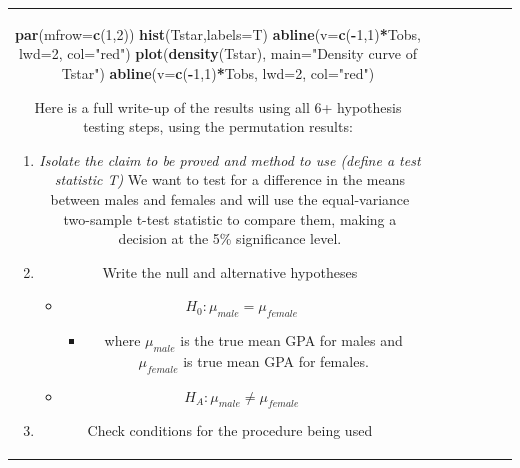 \documentclass[]{book}
\newenvironment{Shaded}{\begin{snugshade}}{\end{snugshade}}
\newcommand{\KeywordTok}[1]{\textcolor[rgb]{0.13,0.29,0.53}{\textbf{#1}}}
\newcommand{\DataTypeTok}[1]{\textcolor[rgb]{0.13,0.29,0.53}{#1}}
\newcommand{\DecValTok}[1]{\textcolor[rgb]{0.00,0.00,0.81}{#1}}
\newcommand{\StringTok}[1]{\textcolor[rgb]{0.31,0.60,0.02}{#1}}
\newcommand{\OperatorTok}[1]{\textcolor[rgb]{0.81,0.36,0.00}{\textbf{#1}}}
\newcommand{\NormalTok}[1]{#1}
\providecommand{\tightlist}{%
  \setlength{\itemsep}{0pt}\setlength{\parskip}{0pt}}
\theoremstyle{definition}
\theoremstyle{definition}
\theoremstyle{remark}
\begin{document}
\begin{longtable}[]{@{}ccccccc@{}}
\begin{minipage}[b]{0.10\columnwidth}
\begin{Shaded}
\begin{Highlighting}[]
\begin{Shaded}
\begin{Highlighting}[]
\begin{Shaded}
\begin{Highlighting}[]
\KeywordTok{par}\NormalTok{(}\DataTypeTok{mfrow=}\KeywordTok{c}\NormalTok{(}\DecValTok{1}\NormalTok{,}\DecValTok{2}\NormalTok{))}
\KeywordTok{hist}\NormalTok{(Tstar,}\DataTypeTok{labels=}\NormalTok{T)}
\KeywordTok{abline}\NormalTok{(}\DataTypeTok{v=}\KeywordTok{c}\NormalTok{(}\OperatorTok{-}\DecValTok{1}\NormalTok{,}\DecValTok{1}\NormalTok{)}\OperatorTok{*}\NormalTok{Tobs, }\DataTypeTok{lwd=}\DecValTok{2}\NormalTok{, }\DataTypeTok{col=}\StringTok{"red"}\NormalTok{)}
\KeywordTok{plot}\NormalTok{(}\KeywordTok{density}\NormalTok{(Tstar), }\DataTypeTok{main=}\StringTok{"Density curve of Tstar"}\NormalTok{)}
\KeywordTok{abline}\NormalTok{(}\DataTypeTok{v=}\KeywordTok{c}\NormalTok{(}\OperatorTok{-}\DecValTok{1}\NormalTok{,}\DecValTok{1}\NormalTok{)}\OperatorTok{*}\NormalTok{Tobs, }\DataTypeTok{lwd=}\DecValTok{2}\NormalTok{, }\DataTypeTok{col=}\StringTok{"red"}\NormalTok{)}
\end{Highlighting}
\end{Shaded}

Here is a full write-up of the results using all 6+ hypothesis testing
steps, using the permutation results:

\begin{enumerate}
\def\labelenumi{\arabic{enumi}.}
\setcounter{enumi}{-1}
\item
  \emph{Isolate the claim to be proved and method to use (define a test
  statistic T)} We want to test for a difference in the means between
  males and females and will use the equal-variance two-sample t-test
  statistic to compare them, making a decision at the 5\% significance
  level.
\item
  Write the null and alternative hypotheses

  \begin{itemize}
  \item
    \(H_0: \mu_{male} = \mu_{female}\)

    \begin{itemize}
    \tightlist
    \item
      where \(\mu_{male}\) is the true mean GPA for males and
      \(\mu_{female}\) is true mean GPA for females.
    \end{itemize}
  \item
    \(H_A: \mu_{male} \ne \mu_{female}\)
  \end{itemize}
\item
  Check conditions for the procedure being used


\end{enumerate}
\end{Highlighting}
\end{Shaded}
\end{Highlighting}
\end{Shaded}
\end{minipage}
\end{longtable}
\end{document}
